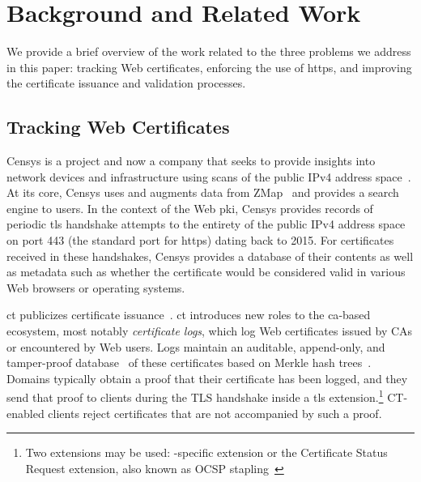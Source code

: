 \section{Background and Related Work}
\label{sec:background}

We provide a brief overview of the work related to the
three problems we address in this paper: tracking Web certificates, enforcing
the use of \ac{https}, and improving the certificate issuance and validation
processes.

\subsection{Tracking Web Certificates}\label{sec:tracking}

Censys is a project and now a company that seeks to provide insights into
network devices and infrastructure using scans of the public IPv4 address
space~\cite{durumeric2015search}. At its core, Censys uses and augments data from
ZMap~\cite{durumeric2013zmap} and provides a search engine to users. In the
context of the Web \ac{pki}, Censys provides records of periodic \ac{tls}
handshake attempts to the entirety of the public IPv4 address space on port 443
(the standard port for \ac{https}) dating back to 2015. For certificates
received in these handshakes, Censys provides a database of their contents as
well as metadata such as whether the certificate would be considered valid in
various Web browsers or operating systems.

\acf{ct} publicizes certificate issuance~\cite{rfc6962}. 
\ac{ct} introduces new roles to the \ac{ca}-based
ecosystem, most notably \emph{certificate logs}, 
which log Web certificates issued by CAs or encountered by Web users.
Logs maintain an auditable, append-only, and tamper-proof database~\cite{crosby2009efficient} of
these certificates based on Merkle hash trees~\cite{merkle1988digital}. 
Domains typically obtain a proof that their certificate
has been logged, and they send that proof to clients during 
the TLS handshake inside a \ac{tls} extension.\footnote{Two extensions may be used: 
-specific extension or the Certificate Status Request extension, also
known as OCSP stapling~\cite{rfc6066}}
CT-enabled clients reject certificates that are not accompanied by such a proof.


